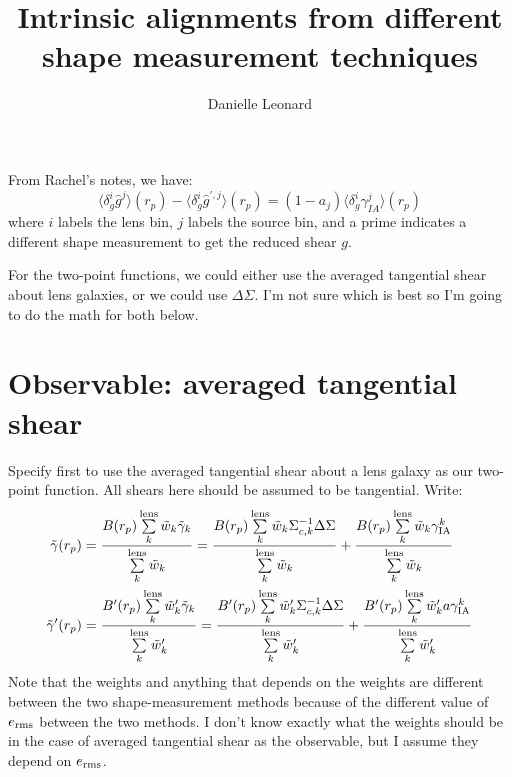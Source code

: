 \documentclass[onecolumn,amsmath,aps,fleqn, superscriptaddress]{revtex4}
\begin{document}
\title{Intrinsic alignments from different shape measurement techniques}

\author{Danielle Leonard}

\maketitle

From Rachel's notes, we have:
\begin{equation}
\langle \delta_g^i \hat{g}^j\rangle(r_p) - \langle \delta_g^i \hat{g}^{\prime,j}\rangle(r_p) = (1-a_j)\langle \delta_g^i \gamma_{IA}^j\rangle(r_p)
\label{gen_2pt}
\end{equation}
where $i$ labels the lens bin, $j$ labels the source bin, and a prime indicates a different shape measurement to get the reduced shear $g$.

For the two-point functions, we could either use the averaged tangential shear about lens galaxies, or we could use $\Delta \Sigma$. I'm not sure which is best so I'm going to do the math for both below.

\section{Observable: averaged tangential shear}
Specify first to use the averaged tangential shear about a lens galaxy as our two-point function. All shears here should be assumed to be tangential. Write:
\begin{align}
\tilde{\gamma}(r_p) &= \frac{B(r_p) \sum\limits_{k}^{\rm lens} \tilde{w}_k \tilde{\gamma}_k}{\sum\limits_{k}^{\rm lens} \tilde{w}_k} = \frac{B(r_p) \sum\limits_{k}^{\rm lens} \tilde{w}_k \Sigma_{c,k}^{-1}\Delta\Sigma}{\sum\limits_{k}^{\rm lens} \tilde{w}_k}+\frac{B(r_p) \sum\limits_{k}^{\rm lens} \tilde{w}_k \gamma_{\rm IA}^k}{\sum\limits_{k}^{\rm lens} \tilde{w}_k} \nonumber \\ 
\tilde{\gamma}'(r_p) &= \frac{B^\prime(r_p) \sum\limits_{k}^{\rm lens} \tilde{w}^\prime_k \tilde{\gamma}_k}{\sum\limits_{k}^{\rm lens} \tilde{w}^\prime_k} = \frac{B^\prime(r_p) \sum\limits_{k}^{\rm lens} \tilde{w}^\prime_k \Sigma_{c,k}^{-1}\Delta\Sigma}{\sum\limits_{k}^{\rm lens} \tilde{w}^\prime_k}+\frac{B^\prime(r_p) \sum\limits_{k}^{\rm lens} \tilde{w}^\prime_k a \gamma_{\rm IA}^k}{\sum\limits_{k}^{\rm lens} \tilde{w}^\prime_k} 
\label{full_both}
\end{align}
Note that the weights and anything that depends on the weights are different between the two shape-measurement methods because of the different value of $e_{\rm rms}$ between the two methods. I don't know exactly what the weights should be in the case of averaged tangential shear as the observable, but I assume they depend on $e_{\rm rms}$.
\end{document}
